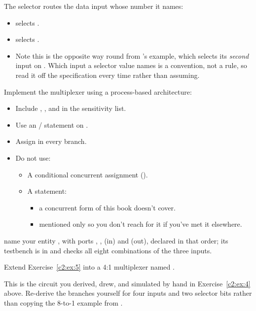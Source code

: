 \noindent The selector routes the data input whose number it names:
\begin{itemize}
  \item {} selects .
  \item {} selects .
  \item Note this is the opposite way round from 's  example, which selects
    its \emph{second} input  on . Which input a selector value names is a
    convention, not a rule, so read it off the specification every time rather than assuming.
\end{itemize}
Implement the multiplexer using a process-based architecture:
\begin{itemize}
  \item Include , , and  in the sensitivity list.
  \item Use an / statement on .
  \item Assign  in every branch.
  \item Do not use:
    \begin{itemize}
      \item A conditional concurrent assignment ().
      \item A  statement:
        \begin{itemize}
          \item a concurrent form of  this book doesn't cover.
          \item mentioned only so you don't reach for it if you've met it elsewhere.
        \end{itemize}
    \end{itemize}
\end{itemize}


\selfcheck name your entity , with ports , ,  (in) and
 (out), declared in that order; its testbench is in  and checks all
eight combinations of the three inputs.

\label{c2:ex:6}
Extend Exercise~\ref{c2:ex:5} into a 4:1 multiplexer named .

This is the circuit you derived, drew, and simulated by hand in Exercise~\ref{c2:ex:4} above.
Re-derive the  branches yourself for four inputs and two selector bits rather than
copying the 8-to-1 example from .

